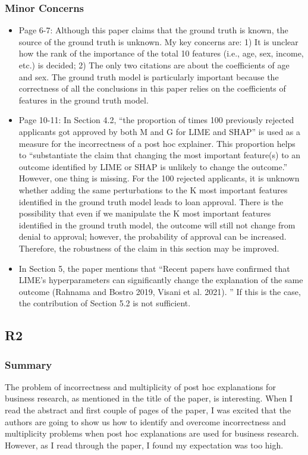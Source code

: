 \documentclass{article} %
\begin{document}
\subsubsection{Minor Concerns}
    \begin{itemize}
        \item Page 6-7: Although this paper claims that the ground truth is known, the source of the ground truth is unknown. My key concerns are: 1) It is unclear how the rank of the importance of the total 10 features (i.e., age, sex, income, etc.) is decided; 2) The only two citations are about the coefficients of age and sex. The ground truth model is particularly important because the correctness of all the conclusions in this paper relies on the coefficients of features in the ground truth model.
        \item Page 10-11: In Section 4.2, “the proportion of times 100 previously rejected applicants got approved by both M and G for LIME and SHAP” is used as a measure for the incorrectness of a post hoc explainer. This proportion helps to “substantiate the claim that changing the most important feature(s) to an outcome identified by LIME or SHAP is unlikely to change the outcome.” However, one thing is missing. For the 100 rejected applicants, it is unknown whether adding the same perturbations to the K most important features identified in the ground truth model leads to loan approval. There is the possibility that even if we manipulate the K most important features identified in the ground truth model, the outcome will still not change from denial to approval; however, the probability of approval can be increased. Therefore, the robustness of the claim in this section may be improved.
        \item In Section 5, the paper mentions that “Recent papers have confirmed that LIME’s hyperparameters can significantly change the explanation of the same outcome (Rahnama and Bostro 2019, Visani et al. 2021). ” If this is the case, the contribution of Section 5.2 is not sufficient.
    \end{itemize}

\subsection{R2}
    \subsubsection{Summary}
 The problem of incorrectness and multiplicity of post hoc explanations for business research, as mentioned in the title of the paper, is interesting. When I read the abstract and first couple of pages of the paper, I was excited that the authors are going to show us how to identify and overcome incorrectness and multiplicity problems when post hoc explanations are used for business research. However, as I read through the paper, I found my expectation was too high.
\end{document}
